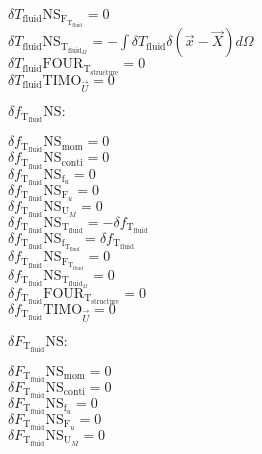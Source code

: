 \documentclass[10pt]{article} %
\begin{document}
\begin{center}
	$\delta T_{\text{fluid}} \text{NS}_{\text{F}_{\text{T}_{\text{fluid}}}} = 0$\\
	$\delta T_{\text{fluid}} \text{NS}_{\text{T}_{\text{fluid}_M}} = -\int \delta T_{\text{fluid}} \delta (\vec{x}-\vec{X}) d\Omega$\\
	$\delta T_{\text{fluid}} \text{FOUR}_{\text{T}_{\text{structure}}} = 0$\\
	$\delta T_{\text{fluid}} \text{TIMO}_{\vec{U}} = 0$\\
\begin{flushleft}
	$\delta f_{\text{T}_{\text{fluid}}} \text{NS}:$
\end{flushleft}
	$\delta f_{\text{T}_{\text{fluid}}} \text{NS}_{\text{mom}} =  0$\\
	$\delta f_{\text{T}_{\text{fluid}}} \text{NS}_{\text{conti}} = 0$\\
	$\delta f_{\text{T}_{\text{fluid}}} \text{NS}_{\text{f}_u} = 0$\\
	$\delta f_{\text{T}_{\text{fluid}}} \text{NS}_{\text{F}_u} = 0$\\
	$\delta f_{\text{T}_{\text{fluid}}} \text{NS}_{\text{U}_M} = 0$\\
	$\delta f_{\text{T}_{\text{fluid}}} \text{NS}_{\text{T}_{\text{fluid}}} = -\delta f_{\text{T}_{\text{fluid}}}$\\
	$\delta f_{\text{T}_{\text{fluid}}} \text{NS}_{\text{f}_{\text{T}_{\text{fluid}}}} = \delta f_{\text{T}_{\text{fluid}}}$\\
	$\delta f_{\text{T}_{\text{fluid}}} \text{NS}_{\text{F}_{\text{T}_{\text{fluid}}}} = 0$\\
	$\delta f_{\text{T}_{\text{fluid}}} \text{NS}_{\text{T}_{\text{fluid}_M}} = 0$\\
	$\delta f_{\text{T}_{\text{fluid}}} \text{FOUR}_{\text{T}_{\text{structure}}} = 0$\\
	$\delta f_{\text{T}_{\text{fluid}}} \text{TIMO}_{\vec{U}} = 0$\\
\begin{flushleft}
	$\delta F_{\text{T}_{\text{fluid}}} \text{NS}:$
\end{flushleft}
	$\delta F_{\text{T}_{\text{fluid}}} \text{NS}_{\text{mom}} = 0$\\
	$\delta F_{\text{T}_{\text{fluid}}} \text{NS}_{\text{conti}} = 0$\\
	$\delta F_{\text{T}_{\text{fluid}}} \text{NS}_{\text{f}_u} = 0$\\
	$\delta F_{\text{T}_{\text{fluid}}} \text{NS}_{\text{F}_u} = 0$\\
	$\delta F_{\text{T}_{\text{fluid}}} \text{NS}_{\text{U}_M} = 0$\\

\end{center}
\end{document}
